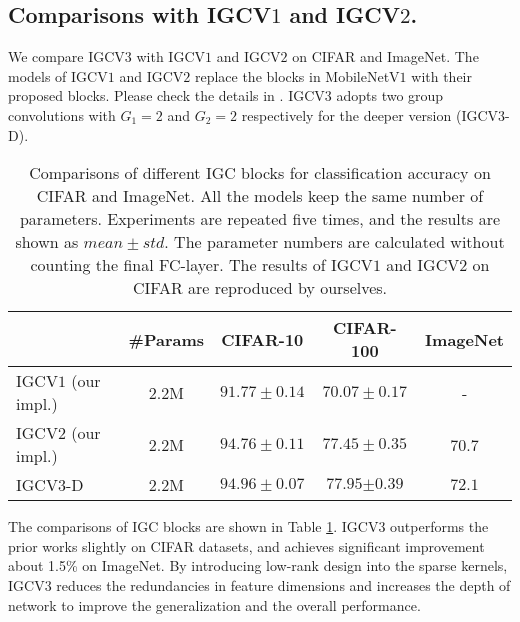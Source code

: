 \documentclass{bmvc2k}
\begin{document}
	\subsection{Comparisons with IGCV$1$ and IGCV$2$.}
	We compare IGCV$3$ with IGCV$1$ and IGCV$2$ on CIFAR and ImageNet. The models of IGCV$1$ and IGCV$2$ replace the blocks in MobileNetV$1$ with their proposed blocks. Please check the details in \cite{zhang2017interleaved,ISSC18}. IGCV$3$ adopts two group convolutions with $G_1=2$ and $G_2=2$ respectively for the deeper version (IGCV$3$-D). 
	
	\begin{table}[htb!]
		\begin{center}
			\begin{tabular}{|l||c|c|c|c|}
				\hline
				& \#Params& CIFAR-10 & CIFAR-100& ImageNet\\
				\hline\hline
				IGCV$1$ (our impl.)    & 2.2M  &   $91.77\pm0.14$    & $70.07\pm0.17$& -\\
				IGCV$2$ (our impl.) & 2.2M  & $94.76\pm0.11$ &$77.45\pm0.35$& 70.7  \\
				IGCV$3$-D & 2.2M & $\mathbf{94.96\pm{0.07}}$ &$\mathbf{77.95{\pm0.39}}$&$\mathbf{72.1}$ \\
				\hline
			\end{tabular}
		\end{center}
		\caption{Comparisons of different IGC blocks for classification accuracy on CIFAR and ImageNet. All the models keep the same number of parameters. Experiments are repeated five times, and the results are shown as $mean\pm std$. The parameter numbers are calculated without counting the final FC-layer. The results of IGCV$1$ and IGCV$2$ on CIFAR are reproduced by ourselves.}
		\label{tab:diiff_igc}
	\end{table}
	
	The comparisons of IGC blocks are shown in Table \ref{tab:diiff_igc}. IGCV$3$ outperforms the prior works slightly on CIFAR datasets, and achieves significant improvement about 1.5\% on ImageNet. 
	By introducing low-rank design into the sparse kernels, IGCV$3$ reduces the redundancies in feature dimensions and increases the depth of network to improve the generalization and the overall performance.
\end{document}

